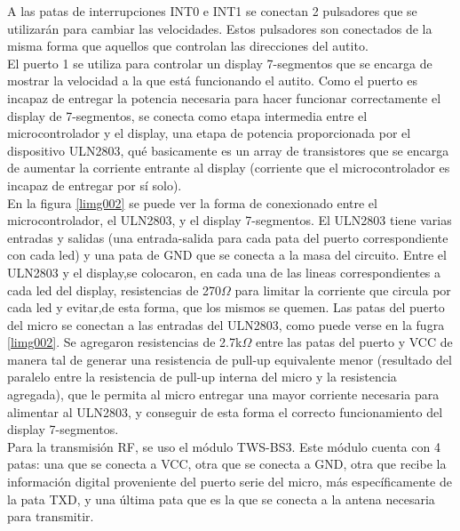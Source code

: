 \documentclass[a4paper,10pt]{article}
\begin{document}
			\indent A las patas de interrupciones INT0 e INT1 se conectan 2 pulsadores que se utilizarán para cambiar las velocidades. Estos pulsadores son 
			conectados de la misma forma que aquellos que controlan las direcciones del autito.\\
			\indent El puerto 1 se utiliza para controlar un display 7-segmentos que se encarga de mostrar la velocidad a la que está funcionando el autito. 
			Como el puerto es incapaz de entregar la potencia necesaria para hacer funcionar correctamente el display de 7-segmentos, se conecta como etapa 
			intermedia entre el microcontrolador y el display, una etapa de potencia proporcionada por el dispositivo ULN2803, qué basicamente es un array 
			de transistores que se encarga de aumentar la corriente entrante al display (corriente que el microcontrolador es incapaz de entregar por sí solo). \\
			\indent En la figura \ref{limg002} se puede ver la forma de conexionado entre el microcontrolador, el ULN2803, y el display 7-segmentos. El ULN2803 
			tiene varias entradas y salidas (una entrada-salida para cada pata del puerto correspondiente con cada led) y una pata de GND que se conecta a la 
			masa del circuito. Entre el ULN2803 y el display,se colocaron, en cada una de las lineas correspondientes a cada led del display, resistencias de 
			270$\Omega$ para limitar la corriente que circula por cada led y evitar,de esta forma, que los mismos se quemen. Las patas del puerto del micro se
			conectan a las entradas del ULN2803, como puede verse en la fugra \ref{limg002}. Se agregaron resistencias de 2.7k$\Omega$ entre las patas del puerto 
			y VCC de manera tal de generar una resistencia de pull-up equivalente menor (resultado del paralelo entre la resistencia de pull-up interna del micro 
			y la resistencia agregada), que le permita al micro entregar una mayor corriente necesaria para alimentar al ULN2803, y conseguir de esta forma el 
			correcto funcionamiento del display 7-segmentos. \\
			\indent Para la transmisión RF, se uso el módulo TWS-BS3. Este módulo cuenta con 4 patas: una que se conecta a VCC, otra que se conecta a GND, otra 
			que recibe la información digital proveniente del puerto serie del micro, más específicamente de la pata TXD, y una última pata que es la que se 
			conecta a la antena necesaria para transmitir.\\
			
\end{document}
